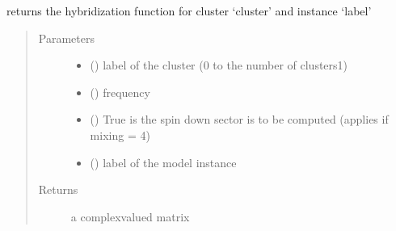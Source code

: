 \documentclass[letterpaper,10pt,english]{sphinxmanual}
\begin{document}
\begin{fulllineitems}
\label{\detokenize{functions:pyqcm.hybridization_function}}
\sphinxAtStartPar
returns the hybridization function for cluster ‘cluster’ and instance ‘label’
\begin{quote}\begin{description}
\item[{Parameters}] \leavevmode\begin{itemize}
\item {} 
\sphinxAtStartPar
{} () \textendash{} label of the cluster (0 to the number of clusters\sphinxhyphen{}1)

\item {} 
\sphinxAtStartPar
{} () \textendash{} frequency

\item {} 
\sphinxAtStartPar
{} () \textendash{} True is the spin down sector is to be computed (applies if mixing = 4)

\item {} 
\sphinxAtStartPar
{} () \textendash{} label of the model instance

\end{itemize}

\item[{Returns}] \leavevmode
\sphinxAtStartPar
a complex\sphinxhyphen{}valued matrix

\end{description}\end{quote}

\end{fulllineitems}

\end{document}
